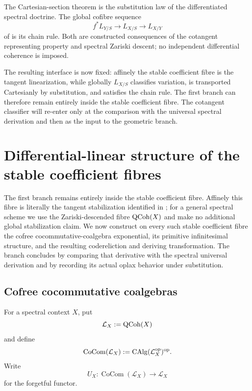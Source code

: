 \begin{remark}
\label{rem:differentiated-substitution-chain-rule}
The Cartesian-section theorem is the substitution law of the differentiated
spectral doctrine. The global cofibre sequence
\[
    f^*L_{Y/S}\longrightarrow L_{X/S}\longrightarrow L_{X/Y}
\]
of  is its chain rule. Both are
constructed consequences of the cotangent representing property and spectral
Zariski descent; no independent differential coherence is imposed.
\end{remark}
The resulting interface is now fixed: affinely the stable coefficient fibre is
the tangent linearization, while globally \(L_{X/S}\) classifies variation,
is transported Cartesianly by substitution, and satisfies the chain rule. The
first branch can therefore remain entirely inside the stable coefficient
fibre. The cotangent classifier will re-enter only at the comparison with the
universal spectral derivation and then as the input to the geometric branch.

\section{Differential-linear structure of the stable coefficient fibres}
\label{sec:differential-linear-tangent-fibres}

The first branch remains entirely inside the stable coefficient fibre.
Affinely this fibre is literally the tangent stabilization identified in
; for a general spectral scheme we use the
Zariski-descended fibre \(\operatorname{QCoh}(X)\) and make no additional global
stabilization claim. We now construct on every such stable coefficient fibre
the cofree cocommutative-coalgebra exponential, its primitive infinitesimal
structure, and the resulting codereliction and deriving transformation. The
branch concludes by comparing that derivative with the spectral universal
derivation and by recording its actual oplax behavior under substitution.

\subsection{Cofree cocommutative coalgebras}

\begin{definition}
\label{def:tangent-cocommutative-coalgebras}
For a spectral context \(X\), put
\[
    \mathcal L_X:=\operatorname{QCoh}(X)
\]
and define
\[
    \operatorname{CoCom}(\mathcal L_X)
    :=
    \operatorname{CAlg}(\mathcal L_X^{\mathrm{op}})^{\mathrm{op}}.
\]
Write
\[
    U_X:\operatorname{CoCom}(\mathcal L_X)\longrightarrow\mathcal L_X
\]
for the forgetful functor.
\end{definition}

